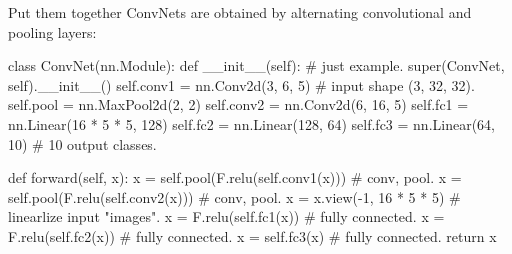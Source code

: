 \begin{frame}[fragile]{Put them together}
\vspace{-5mm}
ConvNets are obtained by alternating convolutional and pooling layers:
\begin{python}
class ConvNet(nn.Module):
    def __init__(self):  # just example.
        super(ConvNet, self).__init__()
        self.conv1 = nn.Conv2d(3, 6, 5)  # input shape (3, 32, 32).
        self.pool = nn.MaxPool2d(2, 2)
        self.conv2 = nn.Conv2d(6, 16, 5)
        self.fc1 = nn.Linear(16 * 5 * 5, 128)
        self.fc2 = nn.Linear(128, 64)
        self.fc3 = nn.Linear(64, 10)  # 10 output classes.

    def forward(self, x):
        x = self.pool(F.relu(self.conv1(x)))  # conv, pool.
        x = self.pool(F.relu(self.conv2(x)))  # conv, pool.
        x = x.view(-1, 16 * 5 * 5)  # linearlize input "images".
        x = F.relu(self.fc1(x))  # fully connected.
        x = F.relu(self.fc2(x))  # fully connected.
        x = self.fc3(x)  # fully connected.
        return x
\end{python}
\end{frame}


